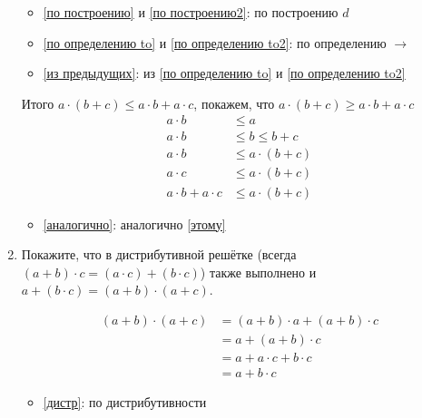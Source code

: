 \begin{enumerate}
          \begin{itemize}
              \item \eqref{по построению} и \eqref{по построению2}: по построению \(d\)
              \item \eqref{по определению to} и \eqref{по определению to2}: по определению \( \to \)
              \item \eqref{из предыдущих}: из \eqref{по определению to} и \eqref{по определению to2}
          \end{itemize}

          Итого \(a\cdot (b + c) \leq a\cdot b + a\cdot c\), покажем, что \(a\cdot (b + c) \geq a\cdot b + a\cdot c\)
          \begin{align}
              a \cdot b             & \leq a                                  \\
              a \cdot b             & \leq b \leq b + c                       \\
              a \cdot b             & \leq a \cdot (b + c) \label{этому}      \\
              a \cdot c             & \leq a \cdot (b + c) \label{аналогично} \\
              a \cdot b + a \cdot c & \leq a \cdot (b + c)
          \end{align}
          \begin{itemize}
              \item \eqref{аналогично}: аналогично \eqref{этому}
          \end{itemize}

    \item Покажите, что в дистрибутивной решётке (всегда $(a + b)\cdot c = (a \cdot c) + (b \cdot c)$) также выполнено
          и $a + (b \cdot c) = (a + b) \cdot (a + c)$.

          \begin{align}
              (a + b) \cdot (a + c) & = (a + b) \cdot a + (a + b) \cdot c \label{дистр} \\
                                    & = a + (a + b) \cdot c                             \\
                                    & = a + a \cdot c + b \cdot c                       \\
                                    & = a + b \cdot c
          \end{align}

          \begin{itemize}
              \item \eqref{дистр}: по дистрибутивности
          \end{itemize}


\end{enumerate}
